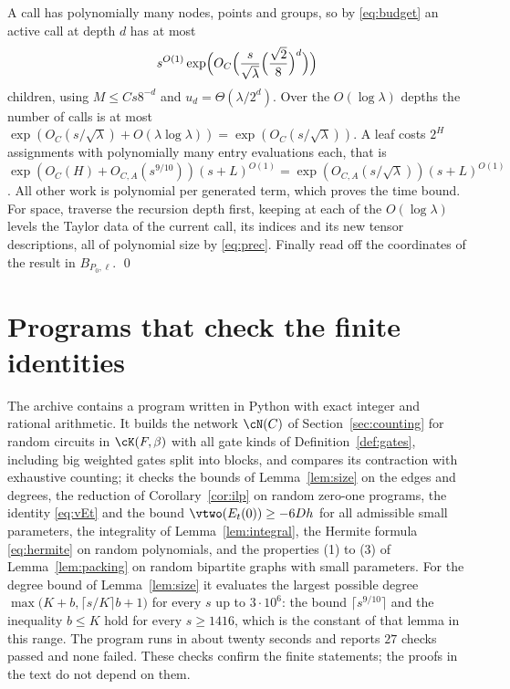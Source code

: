 A call has polynomially many nodes, points and groups, so by
\eqref{eq:budget} an active call at depth $d$ has at most
\[
s^{O(1)}\exp\Bigl(O_C\Bigl(\frac s{\sqrt\lambda}\Bigl(\frac{\sqrt2}8\Bigr)^d\Bigr)\Bigr)
\]
children, using $M\le Cs8^{-d}$ and $u_d=\Theta(\lambda/2^d)$. Over the
$O(\log\lambda)$ depths the number of calls is at most
$\exp(O_C(s/\sqrt\lambda)+O(\lambda\log\lambda))=\exp(O_C(s/\sqrt\lambda))$. A leaf
costs $2^H$ assignments with polynomially many entry evaluations each, that is
$\exp(O_C(H)+O_{C,A}(s^{9/10}))(s+L)^{O(1)}=\exp(O_{C,A}(s/\sqrt\lambda))(s+L)^{O(1)}$.
All other work is polynomial per generated term, which proves the time bound.
For space, traverse the recursion depth first, keeping at each of the
$O(\log\lambda)$ levels the Taylor data of the current call, its indices and its
new tensor descriptions, all of polynomial size by \eqref{eq:prec}. Finally read
off the coordinates of the result in $B_{P_0,\ell}$. \qed

\section{Programs that check the finite identities}\label{app:checks}

The archive contains a program written in Python with exact integer and
rational arithmetic. It builds the network $\cN(C)$ of
Section~\ref{sec:counting} for random circuits in $\cK(F,\beta)$ with all gate
kinds of Definition~\ref{def:gates}, including big weighted gates split into
blocks, and compares its contraction with exhaustive counting; it checks the
bounds of Lemma~\ref{lem:size} on the edges and degrees, the reduction of
Corollary~\ref{cor:ilp} on random zero-one programs, the identity
\eqref{eq:vEt} and the bound $\vtwo(E_t(0))\ge-6Dh$ for all admissible small
parameters, the integrality of Lemma~\ref{lem:integral}, the Hermite formula
\eqref{eq:hermite} on random polynomials, and the properties (1) to (3) of
Lemma~\ref{lem:packing} on random bipartite graphs with small parameters. For
the degree bound of Lemma~\ref{lem:size} it evaluates the largest possible
degree $\max\bigl(K+b,\lceil s/K\rceil b+1\bigr)$ for every $s$ up to
$3\cdot10^6$: the bound $\lceil s^{9/10}\rceil$ and the inequality $b\le K$ hold
for every $s\ge1416$, which is the constant of that lemma in this range. The
program runs in about twenty seconds and reports $27$ checks passed and none
failed. These checks confirm the finite statements; the proofs in the text do
not depend on them.
